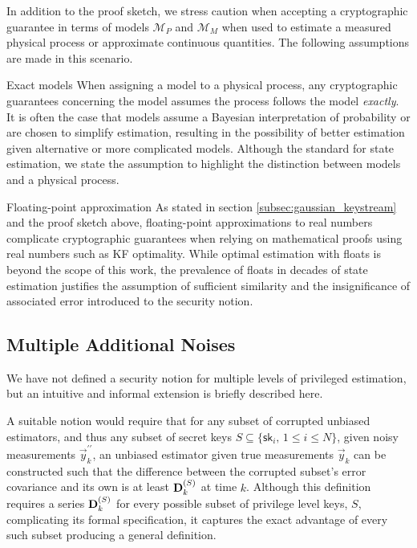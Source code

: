 \documentclass[letterpaper, 10 pt, conference]{IEEEtran}
\theoremstyle{definition}
\begin{document}
In addition to the proof sketch, we stress caution when accepting a cryptographic guarantee in terms of models $\mathcal{M}_P$ and $\mathcal{M}_M$ when used to estimate a measured physical process or approximate continuous quantities. The following assumptions are made in this scenario.
\begin{LaTeXdescription}
   \item[Exact models] When assigning a model to a physical process, any cryptographic guarantees concerning the model assumes the process follows the model \textit{exactly}. It is often the case that models assume a Bayesian interpretation of probability or are chosen to simplify estimation, resulting in the possibility of better estimation given alternative or more complicated models. Although the standard for state estimation, we state the assumption to highlight the distinction between models and a physical process.
   \item[Floating-point approximation] As stated in section \ref{subsec:gaussian_keystream} and the proof sketch above, floating-point approximations to real numbers complicate cryptographic guarantees when relying on mathematical proofs using real numbers such as KF optimality. While optimal estimation with floats is beyond the scope of this work, the prevalence of floats in decades of state estimation justifies the assumption of sufficient similarity and the insignificance of associated error introduced to the security notion.
\end{LaTeXdescription}

% 
% 

\subsection{Multiple Additional Noises}
We have not defined a security notion for multiple levels of privileged estimation, but an intuitive and informal extension is briefly described here. 

A suitable notion would require that for any subset of corrupted unbiased estimators, and thus any subset of secret keys $S \subseteq \{\mathsf{sk}_i,\,1\leq i\leq N\}$, given noisy measurements $\vec{y}_k^{\prime\prime}$, an unbiased estimator given true measurements $\vec{y}_k$ can be constructed such that the difference between the corrupted subset's error covariance and its own is at least ${{\mathbf{D}}}^{(S)}_k$ at time $k$. Although this definition requires a series ${{\mathbf{D}}}^{(S)}_k$ for every possible subset of privilege level keys, $S$, complicating its formal specification, it captures the exact advantage of every such subset producing a general definition.
\end{document}
